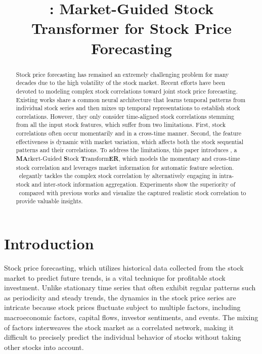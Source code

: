 \title{\frameworkname: Market-Guided Stock Transformer for Stock Price Forecasting}



\maketitle

\begin{abstract}
Stock price forecasting has remained an extremely challenging problem for many decades due to the high volatility of the stock market. 
Recent efforts have been devoted to modeling complex stock correlations toward joint stock price forecasting. Existing works share a common neural architecture that learns temporal patterns from individual stock series and then mixes up temporal representations to establish stock correlations. 
However, they only consider time-aligned stock correlations stemming from all the input stock features, which suffer from two limitations. First, stock correlations often occur momentarily and in a cross-time manner. Second, the feature effectiveness is dynamic with market variation, which affects both the stock sequential patterns and their correlations.
To address the limitations, this paper introduces
\frameworkname, a \textbf{MA}rkert-Guided \textbf{S}tock \textbf{T}ransform\textbf{ER}, which models the momentary and cross-time stock correlation and leverages market information for automatic feature selection. \frameworkname~elegantly tackles the complex stock correlation by alternatively engaging in intra-stock and inter-stock information aggregation. 
Experiments show the superiority of \frameworkname~compared with previous works and visualize the captured realistic stock correlation to provide valuable insights.
\end{abstract}

\section{Introduction}
Stock price forecasting, which utilizes historical data collected from the stock market to predict future trends, is a vital technique for profitable stock investment.
Unlike stationary time series that often exhibit regular patterns such as periodicity and steady trends, the dynamics in the stock price series are intricate because stock prices fluctuate subject to multiple factors, including macroeconomic factors, capital flows, investor sentiments, and events. 
The mixing of factors interweaves the stock market as a correlated network, making it difficult to precisely predict the individual behavior of stocks without taking other stocks into account. 

